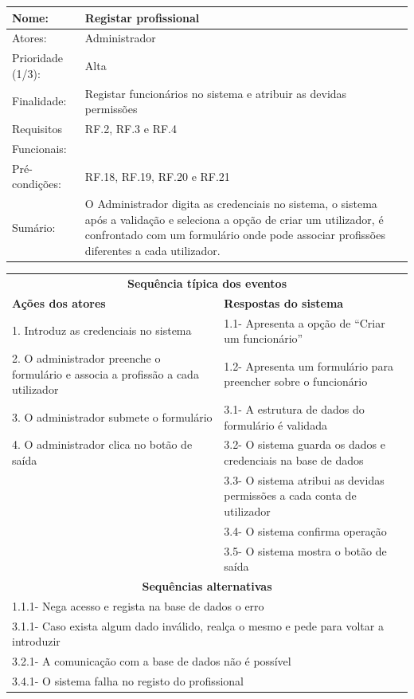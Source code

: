 \documentclass[11pt,a4paper,twoside]{report}
\begin{document}
\begin{center}
	\begin{tabularx}{\textwidth}{|lX|}
		\hline
		\textbf{Nome}: & \textbf{Registar profissional} \\ \hline
		Atores: & Administrador \\ \hline
		Prioridade (1/3): & Alta \\ \hline
		Finalidade: & Registar funcionários no sistema e atribuir as devidas permissões \\ \hline
		Requisitos & RF.2, RF.3 e RF.4  \\
		Funcionais: & \\
		Pré-condições: & RF.18, RF.19, RF.20 e RF.21  \\
		Sumário: & O Administrador digita as credenciais no sistema, o sistema após a validação e seleciona a opção de criar um utilizador, é confrontado com um formulário onde pode associar profissões diferentes a cada utilizador.\\
		\hline
	\end{tabularx}
	
	\begin{tabularx}{\textwidth}{|XX|}
		\hline
		\multicolumn{2}{|c|}{\textbf{Sequência típica dos eventos} }\\
		\textbf{Ações dos atores}  & \textbf{Respostas do sistema} \\
		1. Introduz as credenciais no sistema  & 1.1-      Apresenta a opção de “Criar um funcionário”  \\
		2. O administrador preenche o formulário e associa a profissão a cada utilizador  & 1.2-  Apresenta um formulário para preencher sobre o funcionário   \\
		3.  O administrador submete o formulário  & 3.1- A estrutura de dados do formulário é validada  \\
		4.  O administrador clica no botão de saída  & 3.2- O sistema guarda os dados e credenciais na base de dados  \\
		& 3.3- O sistema atribui as devidas permissões a cada conta de utilizador  \\
		& 3.4- O sistema confirma operação \\
		& 3.5- O sistema mostra o botão de saída \\
		
		\hline
		\multicolumn{2}{|c|}{\textbf{Sequências alternativas } }\\
		\hline
		\multicolumn{2}{|l|}{1.1.1- Nega acesso e regista na base de dados o erro    }\\
		\multicolumn{2}{|l|}{3.1.1- Caso exista algum dado inválido, realça o mesmo e pede para voltar a introduzir     }\\
		\multicolumn{2}{|l|}{3.2.1- A comunicação com a base de dados não é possível  }\\ 
		\multicolumn{2}{|l|}{3.4.1- O sistema falha no registo do profissional   }\\ \hline
	\end{tabularx}
	
\end{center}
\end{document}
